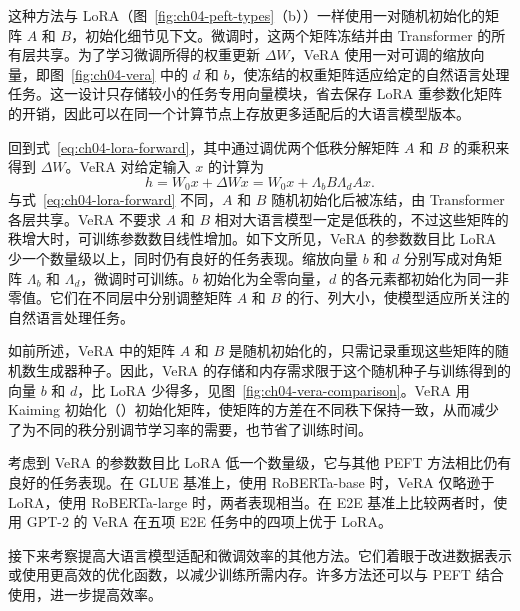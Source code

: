 
这种方法与 LoRA（图~\ref{fig:ch04-peft-types}（b））一样使用一对随机初始化的矩阵 $A$ 和 $B$，初始化细节见下文。微调时，这两个矩阵冻结并由 Transformer 的所有层共享。为了学习微调所得的权重更新 $\Delta W$，VeRA 使用一对可调的缩放向量，即图~\ref{fig:ch04-vera} 中的 $d$ 和 $b$，使冻结的权重矩阵适应给定的自然语言处理任务。这一设计只存储较小的任务专用向量模块，省去保存 LoRA 重参数化矩阵的开销，因此可以在同一个计算节点上存放更多适配后的大语言模型版本。


回到式~\eqref{eq:ch04-lora-forward}，其中通过调优两个低秩分解矩阵 $A$ 和 $B$ 的乘积来得到 $\Delta W$。VeRA 对给定输入 $x$ 的计算为
\begin{equation}
h=W_0x+\Delta W x=W_0x+\Lambda_b B\Lambda_d A x.
\label{eq:ch04-vera-forward}
\end{equation}
与式~\eqref{eq:ch04-lora-forward} 不同，$A$ 和 $B$ 随机初始化后被冻结，由 Transformer 各层共享。VeRA 不要求 $A$ 和 $B$ 相对大语言模型一定是低秩的，不过这些矩阵的秩增大时，可训练参数数目线性增加。如下文所见，VeRA 的参数数目比 LoRA 少一个数量级以上，同时仍有良好的任务表现。缩放向量 $b$ 和 $d$ 分别写成对角矩阵 $\Lambda_b$ 和 $\Lambda_d$，微调时可训练。$b$ 初始化为全零向量，$d$ 的各元素都初始化为同一非零值。它们在不同层中分别调整矩阵 $A$ 和 $B$ 的行、列大小，使模型适应所关注的自然语言处理任务。

如前所述，VeRA 中的矩阵 $A$ 和 $B$ 是随机初始化的，只需记录重现这些矩阵的随机数生成器种子。因此，VeRA 的存储和内存需求限于这个随机种子与训练得到的向量 $b$ 和 $d$，比 LoRA 少得多，见图~\ref{fig:ch04-vera-comparison}。VeRA 用 Kaiming 初始化（）初始化矩阵，使矩阵的方差在不同秩下保持一致，从而减少了为不同的秩分别调节学习率的需要，也节省了训练时间。

考虑到 VeRA 的参数数目比 LoRA 低一个数量级，它与其他 PEFT 方法相比仍有良好的任务表现。在 GLUE 基准上，使用 RoBERTa-base 时，VeRA 仅略逊于 LoRA，使用 RoBERTa-large 时，两者表现相当。在 E2E 基准上比较两者时，使用 GPT-2 的 VeRA 在五项 E2E 任务中的四项上优于 LoRA。

接下来考察提高大语言模型适配和微调效率的其他方法。它们着眼于改进数据表示或使用更高效的优化函数，以减少训练所需内存。许多方法还可以与 PEFT 结合使用，进一步提高效率。
